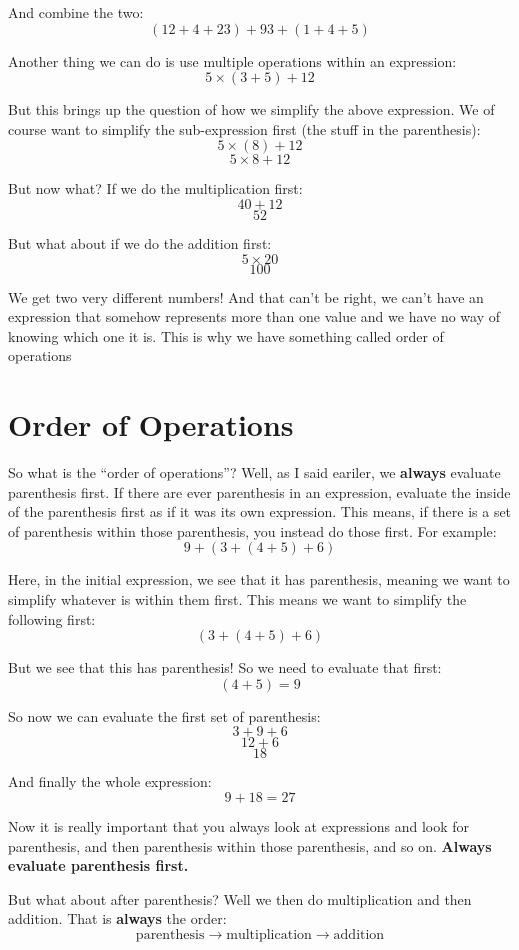 \documentclass{article}
\begin{document}
And combine the two: 
\[ (12 + 4 + 23) + 93 + (1 +4 +5) \]

Another thing we can do is use multiple operations within an expression: 
\[ 5 \times (3 + 5) + 12 \]

But this brings up the question of how we simplify the above expression. We of course want to simplify the sub-expression first (the stuff in the parenthesis):
\[ 5 \times (8) + 12 \]
\[ 5 \times 8 + 12 \]

But now what? If we do the multiplication first: 
\[ 40 + 12 \]
\[ 52 \]

But what about if we do the addition first: 
\[ 5 \times 20 \]
\[ 100 \]

We get two very different numbers! And that can't be right, we can't have an expression that somehow represents more than one value and we have no way of knowing which one it is. This is why we have something called order of operations

\section*{Order of Operations}
So what is the ``order of operations''? Well, as I said eariler, we \textbf{always} evaluate parenthesis first. If there are ever parenthesis in an expression, evaluate the inside of the parenthesis first as if it was its own expression. This means, if there is a set of parenthesis within those parenthesis, you instead do those first. For example:
\[ 9 + (3 + (4 + 5) + 6) \]

Here, in the initial expression, we see that it has parenthesis, meaning we want to simplify whatever is within them first. This means we want to simplify the following first:
\[ (3 + (4+5) + 6) \]

But we see that this has parenthesis! So we need to evaluate that first: 
\[ (4+5) = 9\]

So now we can evaluate the first set of parenthesis:
\[ 3 + 9 + 6 \]
\[ 12 + 6 \]
\[ 18 \]

And finally the whole expression: 
\[ 9 + 18 = 27 \]

Now it is really important that you always look at expressions and look for parenthesis, and then parenthesis within those parenthesis, and so on. \textbf{Always evaluate parenthesis first.}

But what about after parenthesis? Well we then do multiplication and then addition. That is \textbf{always} the order:
\[ \text{parenthesis} \to \text{multiplication} \to \text{addition} \]
\end{document}
